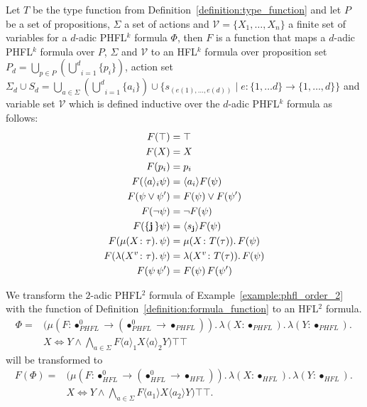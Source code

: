 \begin{definition}
    \label{definition:formula_function}
    Let $T$ be the type function from Definition~\ref{definition:type_function} and let $P$ be a set of propositions,
    $\Sigma$ a set of actions and $\mathcal{V} = \{X_1, \dots, X_n\}$ a finite set of variables for a $d$-adic
    PHFL$^k$ formula $\Phi$, then $F$ is a function that maps a $d$-adic PHFL$^k$ formula over $P$, $\Sigma$ and
    $\mathcal{V}$ to an HFL$^k$ formula over proposition set $P_d = \underset{p \in P}{\bigcup}(\underset{i =
    1}{\overset{d}{\bigcup}} \{p_i\})$, action set $\Sigma_d \cup S_d = \underset{a \in \Sigma}{\bigcup}(\underset{i =
    1}{\overset{d}{\bigcup}} \{a_i\}) \cup \{s_{(e(1), \dots, e(d))} \mid e: \{1, \dots d\} \rightarrow \{1, \dots,
    d\}\}$ and variable set $\mathcal{V}$ which is defined inductive over the $d$-adic PHFL$^k$ formula as follows:
    \begin{align*}
        F(\top) &= \top\\
        F(X) &= X\\
        F(p_i) &= p_i\\
        F(\langle a \rangle_i \psi) &= \langle a_i \rangle F(\psi) \\
        F(\psi \vee \psi') &= F(\psi) \vee F(\psi') \\
        F(\neg \psi) &= \neg F(\psi) \\
        F(\{\emph{j}\,\} \psi) &= \langle s_{\emph{j}} \rangle F(\psi)  \\
        F(\mu (X \colon \tau).\,\psi) &= \mu (X \colon T(\tau)).\,F(\psi) \\
        F(\lambda (X^v \colon \tau).\, \psi) &= \lambda (X^v \colon T(\tau)).\, F(\psi) \\
        F(\psi\,{\psi'}) &= F(\psi)\,F({\psi'})
    \end{align*}
\end{definition}

\begin{example}
    We transform the $2$-adic PHFL$^2$ formula of Example~\ref{example:phfl_order_2} with the function of Definition~\ref{definition:formula_function} to an HFL$^2$ formula.
    \begin{align*}
        \Phi = &(\mu (F \colon \bullet_{PHFL}^0 \rightarrow (\bullet_{PHFL}^0 \rightarrow \bullet_{PHFL})).\,
        \lambda (X \colon \bullet_{PHFL}).\, \lambda (Y \colon \bullet_{PHFL}).\, \\&X \Leftrightarrow Y \wedge
        \underset{a \in \Sigma}{\bigwedge} F \langle a \rangle_1 X \langle a \rangle_2 Y)\top \top
    \end{align*}
    will be transformed to
\begin{align*}
    F(\Phi) = &(\mu (F \colon \bullet_{HFL}^0 \rightarrow (\bullet_{HFL}^0 \rightarrow \bullet_{HFL})).\,
    \lambda (X \colon \bullet_{HFL}).\, \lambda (Y \colon \bullet_{HFL}).\, \\&X \Leftrightarrow Y \wedge \underset{a
    \in \Sigma}{\bigwedge} F \langle a_1 \rangle X \langle a_2 \rangle Y)\top \top.
\end{align*}
\end{example}

